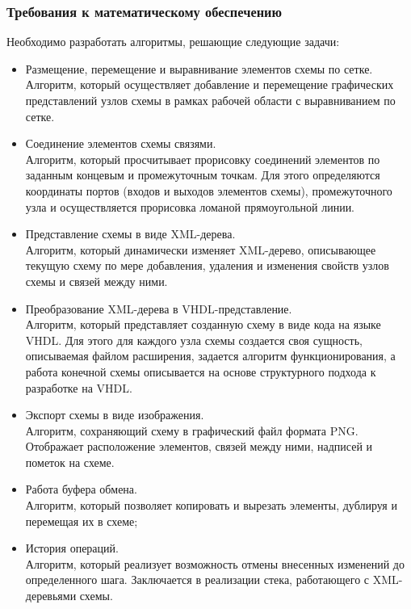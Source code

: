 \subsubsection{Требования к математическому обеспечению} \label{sec:ware:math}
Необходимо разработать алгоритмы, решающие следующие задачи:
\begin{itemize}
  \item Размещение, перемещение и выравнивание элементов схемы по сетке.\\
  Алгоритм, который осуществляет добавление и перемещение графических представлений узлов схемы в рамках рабочей области с выравниванием по сетке.
  \item Соединение элементов схемы связями.\\
  Алгоритм, который просчитывает прорисовку соединений элементов по заданным концевым и промежуточным точкам. Для этого определяются координаты портов (входов и выходов элементов схемы), промежуточного узла и осуществляется прорисовка ломаной прямоугольной линии.
  \item Представление схемы в виде XML-дерева.\\
  Алгоритм, который динамически изменяет XML-дерево, описывающее текущую схему по мере добавления, удаления и изменения свойств узлов схемы и связей между ними.
  \item Преобразование XML-дерева в VHDL-представление.\\
  Алгоритм, который представляет созданную схему в виде кода на языке VHDL. Для этого для каждого узла схемы создается своя сущность, описываемая файлом расширения, задается алгоритм функционирования, а работа конечной схемы описывается на основе структурного подхода к разработке на VHDL.
  \item Экспорт схемы в виде изображения.\\
  Алгоритм, сохраняющий схему в графический файл формата PNG. Отображает расположение элементов, связей между ними, надписей и пометок на схеме.
  \item Работа буфера обмена.\\
  Алгоритм, который позволяет копировать и вырезать элементы, дублируя и перемещая их в схеме;
  \item История операций.\\
  Алгоритм, который реализует возможность отмены внесенных изменений до определенного шага. Заключается в реализации стека, работающего с XML-деревьями схемы.
\end{itemize}

